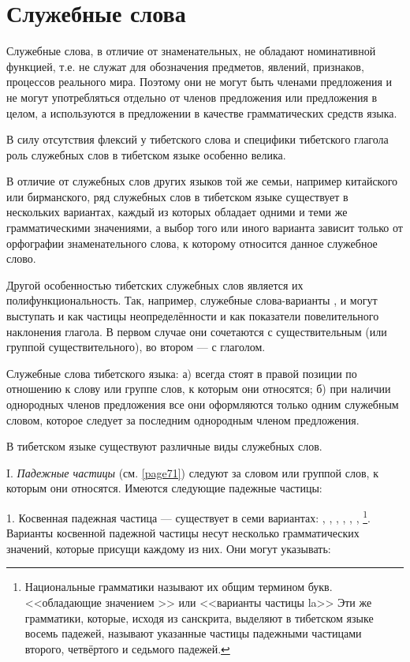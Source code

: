 \section{Служебные слова}
\label{sec:ss}

Служебные слова, в отличие от знаменательных, не обладают номинативной функцией, т.е. не служат для обозначения предметов, явлений, признаков, процессов реального мира. Поэтому они не могут быть членами предложения и не могут употребляться отдельно от членов предложения или предложения в целом, а используются в предложении в качестве грамматических средств языка.

В силу отсутствия флексий у тибетского слова и специфики тибетского глагола роль служебных слов в тибетском языке особенно велика.

В отличие от служебных слов других языков той же семьи, например китайского или бирманского, ряд служебных слов в тибетском языке существует в нескольких вариантах, каждый из которых обладает одними и теми же грамматическими значениями, а выбор того или иного варианта зависит только от орфографии знаменательного слова, к которому относится данное служебное слово.

Другой особенностью тибетских служебных слов является их полифункциональность. Так, например, служебные слова-варианты ,  и  могут выступать и как частицы неопределённости и как показатели повелительного наклонения глагола. В первом случае они сочетаются с существительным (или группой существительного), во втором --- с глаголом.

Служебные слова тибетского языка: а) всегда стоят в правой позиции по отношению к слову или группе слов, к которым они относятся; б) при наличии однородных членов предложения все они оформляются только одним служебным словом, которое следует за последним однородным членом предложения.

В тибетском языке существуют различные виды служебных слов.

I. \emph{Падежные частицы} (см. \ref{page71}) следуют за словом или группой слов, к которым они относятся. Имеются следующие падежные частицы:

1. Косвенная падежная частица --- существует в семи
вариантах: , , , , , , \footnote[40]{Национальные грамматики называют их общим термином  букв. <<обладающие значением >> или <<варианты частицы la>> Эти же грамматики, которые, исходя из санскрита, выделяют в тибетском языке восемь падежей, называют указанные частицы падежными частицами второго, четвёртого и седьмого падежей.}.	
Варианты косвенной падежной частицы несут несколько грамматических значений, которые присущи каждому из них. Они могут указывать:

